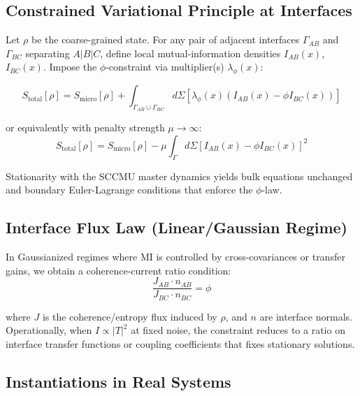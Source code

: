 \documentclass[11pt]{article}
\theoremstyle{definition}
\newcommand{\goldenratio}{\phi}
\newcommand{\density}{\rho}
\begin{document}
\subsection{Constrained Variational Principle at Interfaces}

Let $\density$ be the coarse-grained state. For any pair of adjacent interfaces $\Gamma_{AB}$ and $\Gamma_{BC}$ separating $A|B|C$, define local mutual-information densities $I_{AB}(x)$, $I_{BC}(x)$. Impose the $\goldenratio$-constraint via multiplier(s) $\lambda_\goldenratio(x)$:

\begin{equation}
S_{\text{total}}[\density] = S_{\text{micro}}[\density] + \int_{\Gamma_{AB} \cup \Gamma_{BC}} d\Sigma \left[ \lambda_\goldenratio(x) (I_{AB}(x) - \goldenratio I_{BC}(x)) \right]
\end{equation}

or equivalently with penalty strength $\mu \to \infty$:
\begin{equation}
S_{\text{total}}[\density] = S_{\text{micro}}[\density] - \mu \int_{\Gamma} d\Sigma \left[ I_{AB}(x) - \goldenratio I_{BC}(x) \right]^2
\end{equation}

Stationarity with the SCCMU master dynamics yields bulk equations unchanged and boundary Euler-Lagrange conditions that enforce the $\goldenratio$-law.

\subsection{Interface Flux Law (Linear/Gaussian Regime)}

In Gaussianized regimes where MI is controlled by cross-covariances or transfer gains, we obtain a coherence-current ratio condition:
\begin{equation}
\frac{J_{AB} \cdot n_{AB}}{J_{BC} \cdot n_{BC}} = \goldenratio
\end{equation}

where $J$ is the coherence/entropy flux induced by $\density$, and $n$ are interface normals. Operationally, when $I \propto |T|^2$ at fixed noise, the constraint reduces to a ratio on interface transfer functions or coupling coefficients that fixes stationary solutions.

\subsection{Instantiations in Real Systems}
\end{document}
